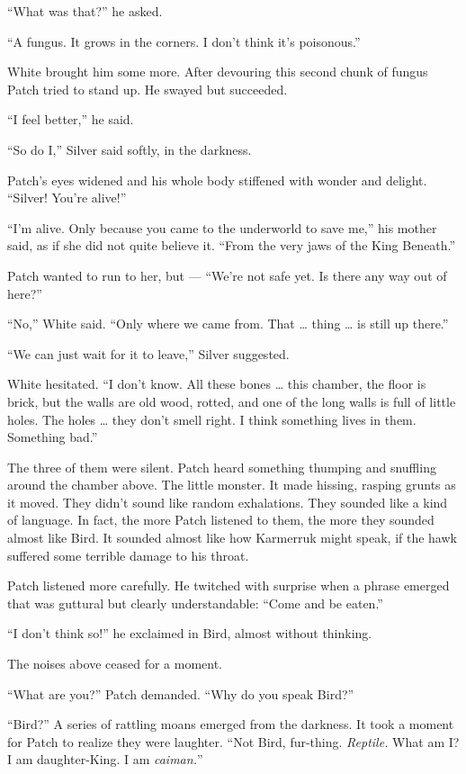 \documentclass[ebook,oneside,openany,17pt]{memoir}
\begin{document}
“What was that?” he asked.

“A fungus. It grows in the corners. I don’t think it’s poisonous.”

White brought him some more. After devouring this second chunk of
fungus Patch tried to stand up. He swayed but succeeded.

“I feel better,” he said.

“So do I,” Silver said softly, in the darkness.

Patch’s eyes widened and his whole body stiffened with wonder and
delight. “Silver! You’re alive!”

“I’m alive. Only because you came to the underworld to save me,” his
mother said, as if she did not quite believe it. “From the very jaws
of the King Beneath.”

Patch wanted to run to her, but — “We’re not safe yet. Is there any
way out of here?”

“No,” White said. “Only where we came from. That … thing … is still up
there.”

“We can just wait for it to leave,” Silver suggested.

White hesitated. “I don’t know. All these bones … this chamber, the
floor is brick, but the walls are old wood, rotted, and one of the
long walls is full of little holes. The holes … they don’t smell
right. I think something lives in them. Something bad.”

The three of them were silent. Patch heard something thumping and
snuffling around the chamber above. The little monster. It made
hissing, rasping grunts as it moved. They didn’t sound like random
exhalations. They sounded like a kind of language. In fact, the more
Patch listened to them, the more they sounded almost like Bird. It
sounded almost like how Karmerruk might speak, if the hawk suffered
some terrible damage to his throat.

Patch listened more carefully. He twitched with surprise when a phrase
emerged that was guttural but clearly understandable: “Come and be
eaten.”

“I don’t think so!” he exclaimed in Bird, almost without thinking.

The noises above ceased for a moment.

“What are you?” Patch demanded. “Why do you speak Bird?”

“Bird?” A series of rattling moans emerged from the darkness. It took
a moment for Patch to realize they were laughter. “Not Bird,
fur-thing. \emph{Reptile.} What am I? I am daughter-King. I am
\emph{caiman.}”
\end{document}
